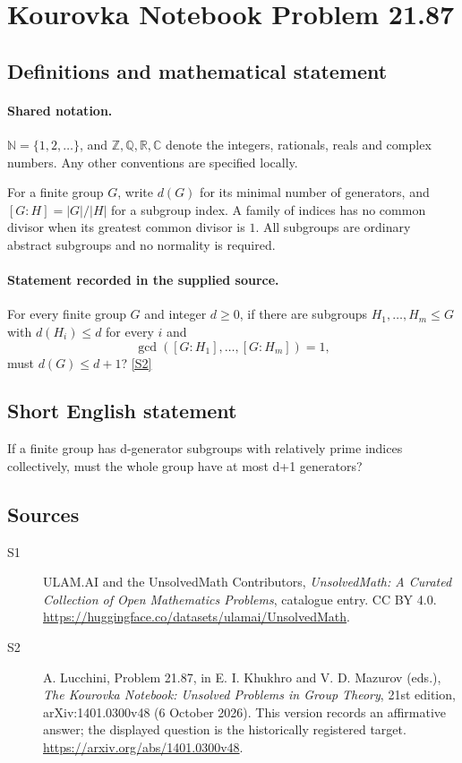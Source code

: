 \documentclass[11pt]{article}
\newcommand{\sref}[2]{\hyperlink{source:#1:#2}{[S#2]}}
\begin{document}
\section{Kourovka Notebook Problem 21.87}\label{statement}

\subsection{Definitions and mathematical statement}

\paragraph{Shared notation.}$\mathbb N=\{1,2,\ldots\}$, and $\mathbb Z,\mathbb Q,\mathbb R,\mathbb C$ denote the integers, rationals, reals and complex numbers. Any other conventions are specified locally.


For a finite group $G$, write $d(G)$ for its minimal number of generators, and $[G:H]=|G|/|H|$ for a subgroup index. A family of indices has no common divisor when its greatest common divisor is $1$. All subgroups are ordinary abstract subgroups and no normality is required.
\paragraph{Statement recorded in the supplied source.}
For every finite group $G$ and integer $d\geq0$, if there are subgroups $H_1,\ldots,H_m\leq G$ with $d(H_i)\leq d$ for every $i$ and
\[
 \gcd([G:H_1],\ldots,[G:H_m])=1,
\]
must $d(G)\leq d+1$? \sref{statement}{2}
\subsection{Short English statement}
If a finite group has d-generator subgroups with relatively prime indices collectively, must the whole group have at most d+1 generators?
\subsection{Sources}
\begin{description}
\item[\hypertarget{source:statement:1}{S1}] ULAM.AI and the UnsolvedMath Contributors, \emph{UnsolvedMath: A Curated Collection of Open Mathematics Problems}, catalogue entry. CC BY 4.0. \url{https://huggingface.co/datasets/ulamai/UnsolvedMath}.
\item[\hypertarget{source:statement:2}{S2}] A. Lucchini, Problem 21.87, in E. I. Khukhro and V. D. Mazurov (eds.), \emph{The Kourovka Notebook: Unsolved Problems in Group Theory}, 21st edition, arXiv:1401.0300v48 (6 October 2026). This version records an affirmative answer; the displayed question is the historically registered target. \url{https://arxiv.org/abs/1401.0300v48}.
\end{description}
\label{end:statement}
\end{document}
